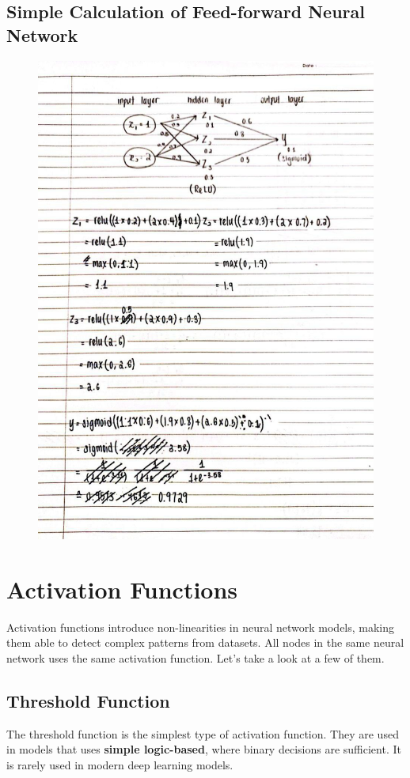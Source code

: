 \documentclass[12pt]{article}
\begin{document}
\subsection{Simple Calculation of Feed-forward Neural Network}
\begin{figure}[h]
\centering
  \includegraphics[width=0.475\linewidth]{images/lecture_04/img_3.png}
  \label{fig:img_3}
\end{figure}

\newpage
\section{Activation Functions}
Activation functions introduce non-linearities in neural network models, making them able to detect complex patterns from datasets. All nodes in the same neural network uses the same activation function. Let's take a look at a few of them.

\subsection{Threshold Function}
The threshold function is the simplest type of activation function. They are used in models that uses \textbf{simple logic-based}, where binary decisions are sufficient. It is rarely used in modern deep learning models.
\end{document}
